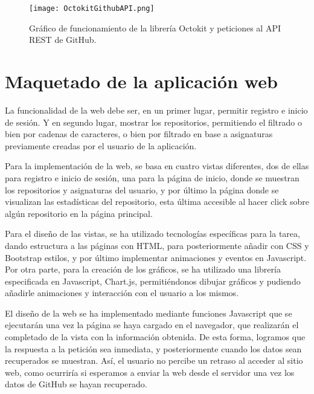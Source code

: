 \begin{figure}[h!]
  \texttt{[image: OctokitGithubAPI.png]}
  \caption{Gráfico de funcionamiento de la librería Octokit y peticiones al
    API REST de GitHub.}
  \label{figure:octokitGitApi}
\end{figure}


\section{Maquetado de la aplicación web}

La funcionalidad de la web debe ser, en un primer lugar, permitir registro
e inicio de sesión. Y en segundo lugar, mostrar los repositorios,
permitiendo el filtrado o bien por cadenas de caracteres, o bien por
filtrado en base a asignaturas previamente creadas por el usuario de la
aplicación.

Para la implementación de la web, se basa en cuatro vistas diferentes, dos
de ellas para registro e inicio de sesión, una para la página de inicio,
donde se muestran los repositorios y asignaturas del usuario, y por último
la página donde se visualizan las estadísticas del repositorio, esta última
accesible al hacer click sobre algún repositorio en la página principal.

Para el diseño de las vistas, se ha utilizado tecnologías específicas para
la tarea, dando estructura a las páginas con HTML, para posteriormente
añadir con CSS\cite{GradienteCSS} y Bootstrap\cite{Bootstrap} estilos, y
por último implementar animaciones y eventos en Javascript. Por otra parte,
para la creación de los gráficos, se ha utilizado una librería especificada
en Javascript, Chart.js\cite{ChartJS,ChartJSIntro}, permitiéndonos dibujar
gráficos y pudiendo añadirle animaciones y interacción con el usuario a los
mismos.


El diseño de la web se ha implementado mediante funciones Javascript que se
ejecutarán una vez la página se haya cargado en el navegador, que
realizarán el completado de la vista con la información obtenida. De esta
forma, logramos que la respuesta a la petición sea inmediata, y
posteriormente cuando los datos sean recuperados se muestran. Así, el
usuario no percibe un retraso al acceder al sitio web, como ocurriría si
esperamos a enviar la web desde el servidor una vez los datos de GitHub se
hayan recuperado.

